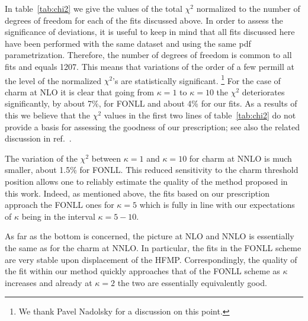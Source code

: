 \documentclass[letter,11pt]{article}
\begin{document}
In table~\ref{tab:chi2} we give the values of the total $\chi^2$ normalized to the number of degrees of freedom for each of the fits discussed above. 
%
In order to assess the significance of deviations, it is useful to keep in mind that all fits discussed here have been performed with the same dataset and using the same pdf parametrization. Therefore, the number of degrees of freedom is common to all fits and equals 1207. This means that variations of the order of a few permill at the level of the normalized $\chi^2$'s are statistically significant.
%
\footnote{We thank Pavel Nadolsky for a discussion on this point.}
%
For the case of charm at NLO it is clear that going from $\kappa=1$ to $\kappa=10$ the $\chi^2$ deteriorates significantly, by about 7\%, for FONLL and about 4\% for our fits. As a results of this we believe that the $\chi^2$ values in the first two lines
of table~\ref{tab:chi2} do not provide a basis for assessing the goodness of our prescription; see also the related discussion in ref.~\cite{Bertone:2017ehk}.

The variation of the $\chi^2$ between $\kappa = 1$ and $\kappa = 10$ for charm at NNLO is much smaller, about 1.5\% for FONLL. This reduced sensitivity to the charm threshold position allows one to reliably estimate the quality of the method proposed in this work. Indeed, as mentioned above, the fits based on our prescription approach the FONLL ones for $\kappa=5$ which is fully in line with our expectations of $\kappa$ being in the interval $\kappa=5-10$.

As far as the bottom is concerned, the picture at NLO and NNLO is essentially the same as for the charm at NNLO. In particular, the fits in the FONLL scheme are very stable upon displacement of the HFMP. Correspondingly, the quality of the fit within our method quickly approaches that of the FONLL scheme as $\kappa$ increases and already at $\kappa = 2$ the two are essentially equivalently good.
\end{document}
